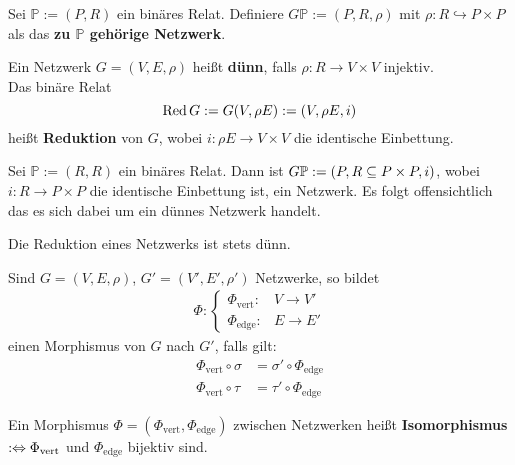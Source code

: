 \begin{definition}
Sei $\mathbb{P}:=(P,R)$ ein binäres Relat. Definiere $G\mathbb{P}:=(P,R,\rho)$ mit $\rho:R\hookrightarrow P\times P$ als das \textbf{zu $\mathbb{P}$ gehörige Netzwerk}.
\end{definition}

\begin{definition}
    Ein Netzwerk $G=(V,E,\rho)$ heißt \textbf{dünn}, 
    falls $\rho:R\to V\times V$ injektiv.\\
    Das binäre Relat
    $$ \Red G := G(V, \rho E) := (V, \rho E, i)$$
    heißt \textbf{Reduktion} von $G$, wobei
    $i: \rho E \to V \times V$ die identische Einbettung.
\end{definition}

\begin{beispiel}
    Sei $\mathbb{P} := (R, R)$ ein binäres Relat.
    Dann ist $G\P := (P, R \subseteq P \times P, i)$, wobei
    $i: R \to P \times P$ die identische Einbettung ist,
    ein Netzwerk.
    Es folgt offensichtlich das es sich dabei um ein dünnes Netzwerk handelt.
\end{beispiel}

\begin{korollar}
    Die Reduktion eines Netzwerks ist stets dünn.
\end{korollar}

\begin{definition}
    Sind $G=(V,E,\rho)$, $G'=(V',E',\rho')$ Netzwerke, so bildet
    \begin{align*}
        \Phi:\left\lbrace\begin{array}{rl}
        \Phi_{\text{vert}}:&V\to V'\\
        \Phi_{\text{edge}}:&E\to E'
        \end{array}\right.
    \end{align*}
    einen Morphismus von $G$ nach $G'$, falls gilt:
    \begin{align*}
        \Phi_{\text{vert}}\circ\sigma&=\sigma'\circ\Phi_{\text{edge}}\\
        \Phi_{\text{vert}}\circ\tau&=\tau'\circ\Phi_{\text{edge}}
    \end{align*}
\end{definition}

\begin{definition}
    Ein Morphismus $\Phi=(\Phi_{\text{vert}},\Phi_{\text{edge}})$ zwischen Netzwerken heißt \textbf{Isomorphismus} $:\gdw\Phi_{\text{vert}}$ und $\Phi_{\text{edge}}$ bijektiv sind.
\end{definition}

